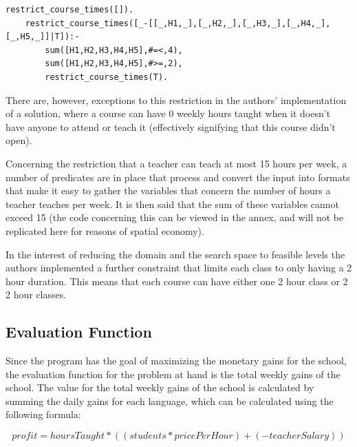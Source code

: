 \documentclass{llncs}
\begin{document}
\begin{verbatim}
restrict_course_times([]).
	restrict_course_times([_-[[_,H1,_],[_,H2,_],[_,H3,_],[_,H4,_],[_,H5,_]]|T]):-
		sum([H1,H2,H3,H4,H5],#=<,4),
		sum([H1,H2,H3,H4,H5],#>=,2),
		restrict_course_times(T).
\end{verbatim}

There are, however, exceptions to this restriction in the authors' implementation of a solution, where a course can have 0 weekly hours taught when it doesn't have anyone to attend or teach it (effectively signifying that this course didn't open).

Concerning the restriction that a teacher can teach at most 15 hours per week, a number of predicates are in place that process and convert the input into formats that make it easy to gather the variables that concern the number of hours a teacher teaches per week. It is then said that the sum of these variables cannot exceed 15 (the code concerning this can be viewed in the annex, and will not be replicated here for reasons of spatial economy).

In the interest of reducing the domain and the search space to feasible levels the authors implemented a further constraint that limits each class to only having a 2 hour duration. This means that each course can have either one 2 hour class or 2 2 hour classes.

\subsection{Evaluation Function}
Since the program has the goal of maximizing the monetary gains for the school, the evaluation function for the problem at hand is the total weekly gains of the school. The value for the total weekly gains of the school is calculated by summing the daily gains for each language, which can be calculated using the following formula:

\begin{equation}
	profit = hoursTaught*((students*pricePerHour)+(-teacherSalary))
\end{equation}
\end{document}
